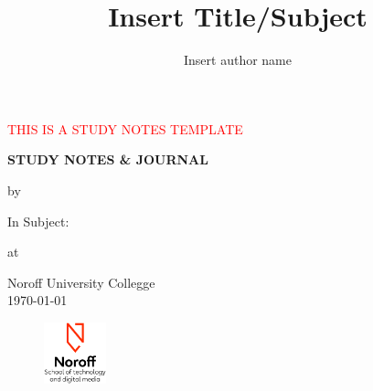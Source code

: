 \begin{titlepage}

  \begin{center}

    \textcolor{red}{\Huge{THIS IS A STUDY NOTES TEMPLATE}} %


      {\bfseries{\Huge{STUDY NOTES \& JOURNAL}}}

      {\Large{by}}

    \begin{author}
      \author{\Large{Insert author name}}
    \end{author}


    \vspace*{4.5cm}
    In Subject:


    \begin{title}
        \title{\bfseries{\huge{Insert Title/Subject}}}
    \end{title}

    \vspace*{2.5cm}
    at


    \Large{Noroff University Collegge\\
    \today}

    \vfill


    \begin{figure}[h!]
      \centering
      \includegraphics[height=50pt]{Noroff-Logo.png}
    \end{figure}


  \end{center}
\end{titlepage}
